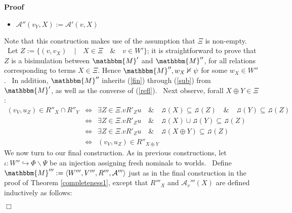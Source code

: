 \documentclass{acmconf}
\newcommand{\assign}{:=}
\newenvironment{itemizedot}{\begin{itemize} \renewcommand{\labelitemi}{$\bullet$}\renewcommand{\labelitemii}{$\bullet$}\renewcommand{\labelitemiii}{$\bullet$}\renewcommand{\labelitemiv}{$\bullet$}}{\end{itemize}}
\newenvironment{proof}{\noindent\textbf{Proof\ }}{\hspace*{\fill}$\Box$\medskip}
\begin{document}
\begin{proof}
\begin{itemizedot}
    \item $\mathcal{A}'' (v_Y, X) \assign \mathcal{A}' (v, X)$
  \end{itemizedot}
  Note that this construction makes use of the assumption that $\Xi$ is
  non-empty. \ Let $Z \assign \{(v, v_X) \hspace{1em} | \hspace{1em} X \in \Xi
  \hspace{1em} \& \hspace{1em} v \in W' \}$; it is straightforward to prove
  that $Z$ is a bisimulation between $\mathbbm{M}'$ and $\mathbbm{M}''$, for
  all relations corresponding to terms $X \in \Xi$. Hence $\mathbbm{M}'', w_X
  \nvDash \psi$ for some $w_X \in W''$. \ In addition, $\mathbbm{M}''$
  inherits (\ref{fin}) through (\ref{sub}) from $\mathbbm{M}'$, as well as the
  converse of (\ref{refl}). \ Next observe, forall $X \oplus Y \in \Xi$:
  \begin{eqnarray*}
    \text{$(v_V, u_Z) \in R''_X \cap R''_Y$} & \Longleftrightarrow & \exists Z
    \in \Xi . \text{$v R'_Z u \hspace{1em} \& \hspace{1em} \twonotes (X)
    \subseteq \twonotes (Z) \hspace{1em} \& \hspace{1em} \twonotes (Y)
    \subseteq \twonotes (Z)$}\\
    & \Longleftrightarrow & \exists Z \in \Xi . \text{$v R'_Z u \hspace{1em}
    \& \hspace{1em} \twonotes (X) \cup \twonotes (Y) \subseteq \twonotes
    (Z)$}\\
    & \Longleftrightarrow & \exists Z \in \Xi . \text{$v R'_Z u \hspace{1em}
    \& \hspace{1em} \twonotes (X \oplus Y) \subseteq \twonotes (Z)$}\\
    & \Longleftrightarrow &  \text{$(v_V, u_Z) \in R''_{X \oplus Y}$}
  \end{eqnarray*}
  We now turn to our final construction. As in previous constructions, let
  $\iota : W'' \hookrightarrow \Phi \backslash \Psi$ be an injection assigning
  fresh nominals to worlds. \ Define $\mathbbm{M}''' \assign \langle W''',
  V''', R''', \mathcal{A}''' \rangle$ just as in the final construction in the
  proof of Theorem \ref{completeness1}, except that $R'''_X$ and
  $\mathcal{A}_v''' (X)$ are defined inductively as follows:
  
  
  

\end{proof}
\end{document}
